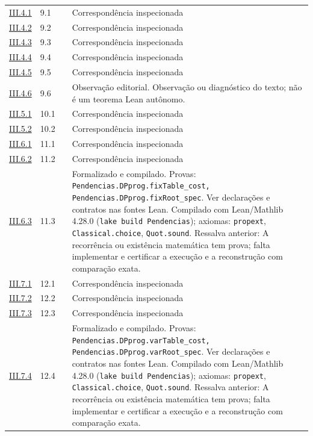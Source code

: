 \documentclass[12pt,a4paper]{article}
\theoremstyle{preciso}
\theoremstyle{definition}
\newcommand{\code}[1]{\nolinkurl{#1}}
\theoremstyle{preciso}
\theoremstyle{preciso}
\theoremstyle{preciso}
\theoremstyle{preciso}
\theoremstyle{definition}
\theoremstyle{preciso}
\theoremstyle{definition}
\theoremstyle{preciso}
\theoremstyle{preciso}
\theoremstyle{definition}
\begin{document}
\begin{singlespace}
\begin{longtable}{@{}p{.11\linewidth}p{.09\linewidth}p{.09\linewidth}p{.59\linewidth}@{}}
\hyperref[map:artigo_2:4.1]{III.4.1} & 9.1 & \pageref{map:artigo_2:4.1} & Correspondência inspecionada\\[4pt]
\hyperref[map:artigo_2:4.2]{III.4.2} & 9.2 & \pageref{map:artigo_2:4.2} & Correspondência inspecionada\\[4pt]
\hyperref[map:artigo_2:4.3]{III.4.3} & 9.3 & \pageref{map:artigo_2:4.3} & Correspondência inspecionada\\[4pt]
\hyperref[map:artigo_2:4.4]{III.4.4} & 9.4 & \pageref{map:artigo_2:4.4} & Correspondência inspecionada\\[4pt]
\hyperref[map:artigo_2:4.5]{III.4.5} & 9.5 & \pageref{map:artigo_2:4.5} & Correspondência inspecionada\\[4pt]
\hyperref[map:artigo_2:4.6]{III.4.6} & 9.6 & \pageref{map:artigo_2:4.6} & Observação editorial. Observação ou diagnóstico do texto; não é um teorema Lean autônomo.\\[4pt]
\hyperref[map:artigo_2:5.1]{III.5.1} & 10.1 & \pageref{map:artigo_2:5.1} & Correspondência inspecionada\\[4pt]
\hyperref[map:artigo_2:5.2]{III.5.2} & 10.2 & \pageref{map:artigo_2:5.2} & Correspondência inspecionada\\[4pt]
\hyperref[map:artigo_2:6.1]{III.6.1} & 11.1 & \pageref{map:artigo_2:6.1} & Correspondência inspecionada\\[4pt]
\hyperref[map:artigo_2:6.2]{III.6.2} & 11.2 & \pageref{map:artigo_2:6.2} & Correspondência inspecionada\\[4pt]
\hyperref[map:artigo_2:6.3]{III.6.3} & 11.3 & \pageref{map:artigo_2:6.3} & Formalizado e compilado. Provas: \code{Pendencias.DPprog.fixTable_cost, Pendencias.DPprog.fixRoot_spec}. Ver declarações e contratos nas fontes Lean. Compilado com Lean/Mathlib 4.28.0 (\texttt{lake build Pendencias}); axiomas: \texttt{propext}, \texttt{Classical.choice}, \texttt{Quot.sound}. Ressalva anterior: A recorrência ou existência matemática tem prova; falta implementar e certificar a execução e a reconstrução com comparação exata.\\[4pt]
\hyperref[map:artigo_2:7.1]{III.7.1} & 12.1 & \pageref{map:artigo_2:7.1} & Correspondência inspecionada\\[4pt]
\hyperref[map:artigo_2:7.2]{III.7.2} & 12.2 & \pageref{map:artigo_2:7.2} & Correspondência inspecionada\\[4pt]
\hyperref[map:artigo_2:7.3]{III.7.3} & 12.3 & \pageref{map:artigo_2:7.3} & Correspondência inspecionada\\[4pt]
\hyperref[map:artigo_2:7.4]{III.7.4} & 12.4 & \pageref{map:artigo_2:7.4} & Formalizado e compilado. Provas: \code{Pendencias.DPprog.varTable_cost, Pendencias.DPprog.varRoot_spec}. Ver declarações e contratos nas fontes Lean. Compilado com Lean/Mathlib 4.28.0 (\texttt{lake build Pendencias}); axiomas: \texttt{propext}, \texttt{Classical.choice}, \texttt{Quot.sound}. Ressalva anterior: A recorrência ou existência matemática tem prova; falta implementar e certificar a execução e a reconstrução com comparação exata.\\[4pt]

\end{longtable}
\end{singlespace}
\end{document}
